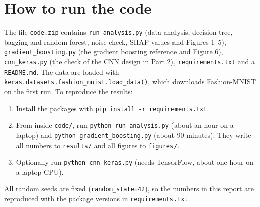 \documentclass[11pt,a4paper]{article}
\newcommand{\pkg}[1]{\texttt{#1}}
\begin{document}
\section{How to run the code}
\label{app:code}
\raggedright
The file \pkg{code.zip} contains \pkg{run\_analysis.py} (data analysis, decision tree, bagging and random forest, noise check, SHAP values and Figures 1--5), \pkg{gradient\_boosting.py} (the gradient boosting reference and Figure 6), \pkg{cnn\_keras.py} (the check of the CNN design in Part 2), \pkg{requirements.txt} and a \pkg{README.md}. The data are loaded with \pkg{keras.datasets.fashion\_mnist.load\_data()}, which downloads Fashion-MNIST on the first run. To reproduce the results:
\begin{enumerate}[leftmargin=*,itemsep=1pt,topsep=2pt]
\item Install the packages with \pkg{pip install -r requirements.txt}.
\item From inside \pkg{code/}, run \pkg{python run\_analysis.py} (about an hour on a laptop) and \pkg{python gradient\_boosting.py} (about 90 minutes). They write all numbers to \pkg{results/} and all figures to \pkg{figures/}.
\item Optionally run \pkg{python cnn\_keras.py} (needs TensorFlow, about one hour on a laptop CPU).
\end{enumerate}
All random seeds are fixed (\pkg{random\_state=42}), so the numbers in this report are reproduced with the package versions in \pkg{requirements.txt}.
\end{document}
